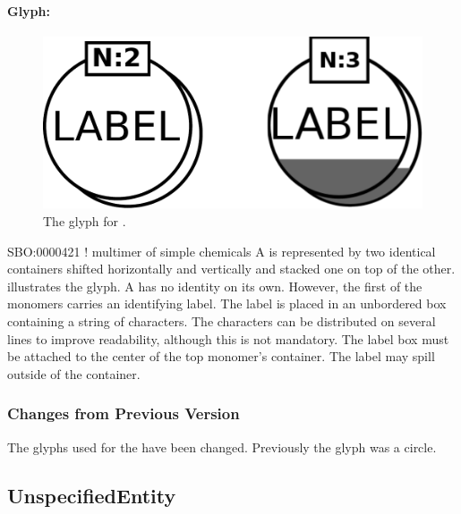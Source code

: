 \paragraph{Glyph: }

\begin{figure}[htb]
  \centering
  \includegraphics[scale = 0.3]{images/simpleChemicalMultimer}
  \caption{The \PD glyph for .}
  \label{fig:multimer}
\end{figure}

\begin{glyphDescription}
\glyphSboTerm SBO:0000421 ! multimer of simple chemicals
\glyphContainer  A  is represented by two identical containers shifted horizontally and vertically and stacked one on top of the other.   illustrates the glyph.
\glyphLabel A  has no identity on its own.  However, the first of the monomers carries an identifying label.  The label is placed in an unbordered box containing a string of characters.  The characters can be distributed on several lines to improve readability, although this is not mandatory.  The label box must be attached to the center of the top monomer's container.  The label may spill outside of the container.
\glyphAux 
\end{glyphDescription}

\subsubsection{Changes from Previous Version}

The glyphs used for the  have been
changed. Previously the glyph was a circle.

\subsection{UnspecifiedEntity}
\label{sec:unspecifiedEntity}

